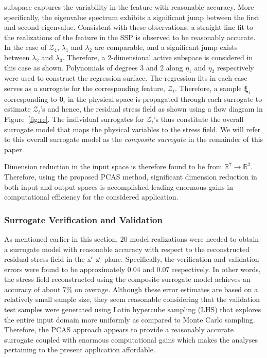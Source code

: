 subspace captures the variability in the feature with reasonable accuracy. More specifically, the
eigenvalue spectrum exhibits a significant jump between the first and second eigenvalue. Consistent
with these observations, a straight-line fit to the realizations of the feature in the SSP is observed to be
reasonably accurate. In the case of $\mathcal{Z}_4$, $\lambda_1$ and $\lambda_2$ are comparable, and
a significant jump exists between $\lambda_2$ and $\lambda_3$. Therefore, a 2-dimensional active
subspace is considered in this case as shown. Polynomials of degrees 3 and 2 along $\eta_1$ and
$\eta_2$ respectively were used to construct the regression surface. The regression-fits in each case
serves as a surrogate for the corresponding feature, $\mathcal{Z}_i$. Therefore, a sample $\bm{\xi}_i$
corresponding to $\bm{\theta}_i$ in the physical space is propagated through each surrogate to estimate
$\mathcal{Z}_i$'s and hence, the residual stress field as shown using a flow diagram in Figure~\ref{fig:re}.
The individual surrogates for $\mathcal{Z}_i$'s thus constitute the overall surrogate model that maps the 
physical variables to the stress field. We will refer to this overall surrogate model as the \textit{composite
surrogate} in the remainder of this paper. 

Dimension reduction in the input space is therefore found to be from $\mathbb{R}^7\rightarrow\mathbb{R}^2$.
Therefore, using the proposed PCAS method, significant dimension reduction in both input and output
spaces is accomplished leading enormous gains in computational efficiency for the considered application.

\subsubsection{Surrogate Verification and Validation}
\label{subsub:vnv}

As mentioned earlier in this section, 20 model realizations were needed to obtain a surrogate model with
reasonable accuracy with respect to the reconstructed residual stress field in the x$^c$-z$^c$ plane. 
Specifically, the verification and validation errors were found to be approximately 0.04 and 
0.07 respectively. In other words, the stress field reconstructed using the
composite surrogate model achieves an accuracy of about 7$\%$ on average. Although these error estimates
are based on a relatively small sample size, they seem reasonable considering that the validation test samples
were generated using Latin hypercube sampling (LHS) that explores the entire input domain more uniformly
as compared to Monte Carlo sampling. Therefore, the PCAS approach appears to provide a reasonably 
accurate surrogate coupled with enormous computational gains which makes the analyses pertaining to
the present application affordable. 

